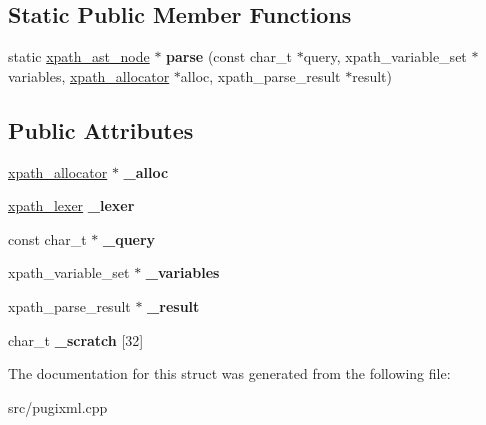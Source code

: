 \subsection*{Static Public Member Functions}
\begin{DoxyCompactItemize}
\item 
\mbox{\label{structxpath__parser_ab865a9a777b466365b3c4bd50290189d}} 
static \hyperlink{classxpath__ast__node}{xpath\+\_\+ast\+\_\+node} $\ast$ {\bfseries parse} (const char\+\_\+t $\ast$query, xpath\+\_\+variable\+\_\+set $\ast$variables, \hyperlink{classxpath__allocator}{xpath\+\_\+allocator} $\ast$alloc, xpath\+\_\+parse\+\_\+result $\ast$result)
\end{DoxyCompactItemize}
\subsection*{Public Attributes}
\begin{DoxyCompactItemize}
\item 
\mbox{\label{structxpath__parser_ac34f5b21ef406bec944286eee2f45836}} 
\hyperlink{classxpath__allocator}{xpath\+\_\+allocator} $\ast$ {\bfseries \+\_\+alloc}
\item 
\mbox{\label{structxpath__parser_a50106db584946e67acd080ef5391a0f4}} 
\hyperlink{classxpath__lexer}{xpath\+\_\+lexer} {\bfseries \+\_\+lexer}
\item 
\mbox{\label{structxpath__parser_aaf5ea5d5be97cdd93adc7a719d8edc1c}} 
const char\+\_\+t $\ast$ {\bfseries \+\_\+query}
\item 
\mbox{\label{structxpath__parser_a3e0adfea7cc81c08b97ee1375831df6c}} 
xpath\+\_\+variable\+\_\+set $\ast$ {\bfseries \+\_\+variables}
\item 
\mbox{\label{structxpath__parser_a9370fb875bfc49ca6e35f3165ecb1692}} 
xpath\+\_\+parse\+\_\+result $\ast$ {\bfseries \+\_\+result}
\item 
\mbox{\label{structxpath__parser_aa9180a17c8ec28977928c815c3425a79}} 
char\+\_\+t {\bfseries \+\_\+scratch} \mbox{[}32\mbox{]}
\end{DoxyCompactItemize}


The documentation for this struct was generated from the following file\+:\begin{DoxyCompactItemize}
\item 
src/pugixml.\+cpp\end{DoxyCompactItemize}
